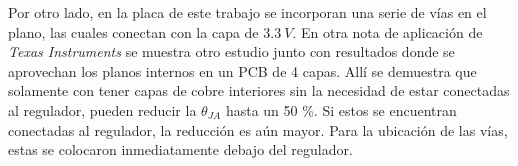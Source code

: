 Por otro lado, en la placa de este trabajo se incorporan una serie de vías en el plano, las cuales conectan con la capa de $3.3 \ V$. En otra nota de aplicación de \textit{Texas Instruments} \cite{SLVAE85} se muestra otro estudio junto con resultados donde se aprovechan los planos internos en un PCB de 4 capas. Allí se demuestra que solamente con tener capas de cobre interiores sin la necesidad de estar conectadas al regulador, pueden reducir la $\theta_{JA}$ hasta un 50 \%. Si estos se encuentran conectadas al regulador, la reducción es aún mayor. Para la ubicación de las vías, estas se colocaron inmediatamente debajo del regulador.










